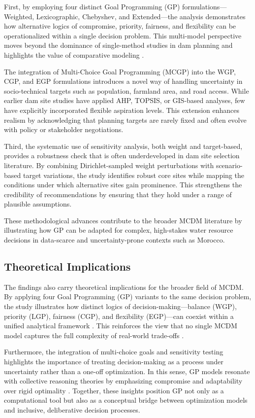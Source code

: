 First, by employing four distinct Goal Programming (GP) formulations—Weighted, Lexicographic, Chebyshev, and Extended—the analysis demonstrates how alternative logics of compromise, priority, fairness, and flexibility can be operationalized within a single decision problem. This multi-model perspective moves beyond the dominance of single-method studies in dam planning and highlights the value of comparative modeling \cite{Belton2002,Aruldoss2013}.  

The integration of Multi-Choice Goal Programming (MCGP) into the WGP, CGP, and EGP formulations introduces a novel way of handling uncertainty in socio-technical targets such as population, farmland area, and road access. While earlier dam site studies have applied AHP, TOPSIS, or GIS-based analyses, few have explicitly incorporated flexible aspiration levels. This extension enhances realism by acknowledging that planning targets are rarely fixed and often evolve with policy or stakeholder negotiations.  

Third, the systematic use of sensitivity analysis, both weight and target-based, provides a robustness check that is often underdeveloped in dam site selection literature. By combining Dirichlet-sampled weight perturbations with scenario-based target variations, the study identifies robust core sites while mapping the conditions under which alternative sites gain prominence. This strengthens the credibility of recommendations by ensuring that they hold under a range of plausible assumptions.  

These methodological advances contribute to the broader MCDM literature by illustrating how GP can be adapted for complex, high-stakes water resource decisions in data-scarce and uncertainty-prone contexts such as Morocco.

\subsection{Theoretical Implications}
The findings also carry theoretical implications for the broader field of MCDM.  
By applying four Goal Programming (GP) variants to the same decision problem, the study illustrates how distinct logics of decision-making—balance (WGP), priority (LGP), fairness (CGP), and flexibility (EGP)—can coexist within a unified analytical framework \cite{jones2010}. This reinforces the view that no single MCDM model captures the full complexity of real-world trade-offs \cite{KUMAR2017596,Aruldoss2013}.

Furthermore, the integration of multi-choice goals and sensitivity testing highlights the importance of treating decision-making as a process under uncertainty rather than a one-off optimization. In this sense, GP models resonate with collective reasoning theories by emphasizing compromise and adaptability over rigid optimality \cite{Borges2020}. Together, these insights position GP not only as a computational tool but also as a conceptual bridge between optimization models and inclusive, deliberative decision processes.

